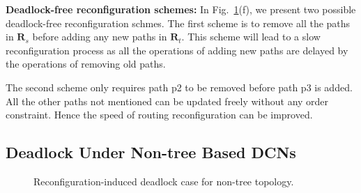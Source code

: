 \textbf{Deadlock-free reconfiguration schemes:} In Fig.~\ref{fig:nontreecase}(f), we present two possible deadlock-free reconfiguration schmes. The first scheme is to remove all the paths in $\textbf{R}_s$ before adding any new paths in $\textbf{R}_t$. This scheme will lead to a slow reconfiguration process as all the operations of adding new paths are delayed by the operations of removing old paths. 

The second scheme only requires path p2 to be removed before path p3 is added. All the other paths not mentioned can be updated freely without any order constraint. Hence the speed of routing reconfiguration can be improved.


\subsection{Deadlock Under Non-tree Based DCNs}\label{subsec:nontreecase}

\begin{figure}[t]
	\centering
	
	
	
	\caption{Reconfiguration-induced deadlock case for non-tree topology.}\label{fig:nontreecase}
	
\end{figure}

